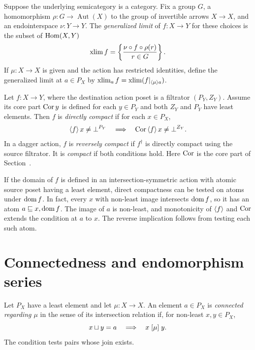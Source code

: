 \begin{defn}\label{def-osa-xlim}
Suppose the underlying semicategory is a category. Fix a group $G$,
a homomorphism $\rho:G\to\operatorname{Aut}(X)$ to the group of
invertible arrows $X\to X$, and an endointerspace $\nu:Y\to Y$.
The \emph{generalized limit} of $f:X\to Y$ for these choices is
the subset of $\operatorname{Hom}(X,Y)$
\[
 \operatorname{xlim} f=\left\{ \frac{\nu\circ f\circ\rho(r)}{r\in G}\right\}.
\]
If $\mu:X\to X$ is given and the action has restricted identities,
define the generalized limit at $a\in P_X$ by
$\operatorname{xlim}_a f=\operatorname{xlim}(f|_{\left\langle \mu\right\rangle a})$.
\end{defn}

\begin{defn}\label{def-osa-compact}
Let $f:X\to Y$, where the destination action poset is a filtrator
$(P_Y,Z_Y)$. Assume its core part $\operatorname{Cor} y$ is defined for each
$y\in P_Y$ and both $Z_Y$ and $P_Y$ have least elements.
Then $f$ is \emph{directly compact} if for each $x\in P_X$,
\[
 \left\langle f\right\rangle x\ne\bot^{P_Y}
 \quad\Longrightarrow\quad
 \operatorname{Cor}\left\langle f\right\rangle x\ne\bot^{Z_Y}.
\]
In a dagger action, $f$ is \emph{reversely compact} if
$f^\dagger$ is directly compact using the source filtrator.
It is \emph{compact} if both conditions hold.
Here $\operatorname{Cor}$ is the core part of Section~.
\end{defn}

If the domain of $f$ is defined in an intersection-symmetric
action with atomic source poset having a least element, direct
compactness can be tested on atoms under $\operatorname{dom} f$. In fact, every
$x$ with non-least image intersects $\operatorname{dom} f$, so it has an atom
$a\sqsubseteq x,\operatorname{dom} f$. The image of $a$ is non-least, and
monotonicity of $\left\langle f\right\rangle$ and $\operatorname{Cor}$ extends the condition at $a$
to $x$. The reverse implication follows from testing each such atom.

\section{Connectedness and endomorphism series}
\label{sec-osa-connected}

\begin{defn}\label{def-osa-connected}
Let $P_X$ have a least element and let $\mu:X\to X$. An element
$a\in P_X$ is \emph{connected regarding $\mu$} in the sense of its
intersection relation if, for non-least $x,y\in P_X$,
\[
 x\sqcup y=a\quad\Longrightarrow\quad x\mathrel{\left[\mu\right]}y .
\]
The condition tests pairs whose join exists.
\end{defn}

